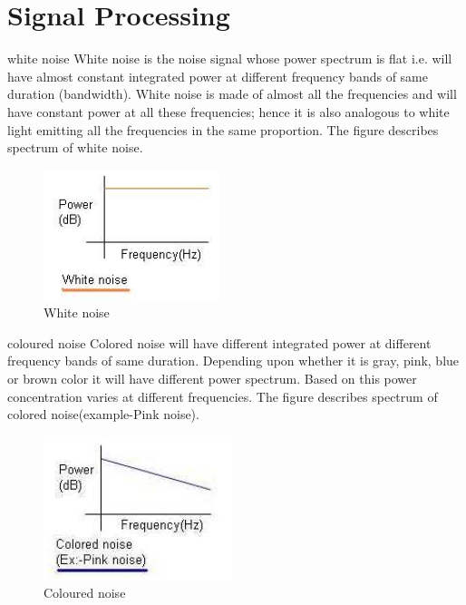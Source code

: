 \chapter{Signal Processing}
\begin{item}
\item[white noise]White noise is the noise signal whose power spectrum is flat i.e. will have almost constant integrated power at different frequency bands of same duration (bandwidth). White noise is made of almost all the frequencies and will have constant power at all these frequencies; hence it is also analogous to white light emitting all the frequencies in the same proportion. The figure describes spectrum of white noise.
\begin{figure}
  \centering
  \includegraphics[scale=0.45]{images/I/wn.png}
  \caption{White noise}\label{fig:wn}
\end{figure}

\item[coloured noise]Colored noise will have different integrated power at different frequency bands of same duration. Depending upon whether it is gray, pink, blue or brown color it will have different power spectrum. Based on this power concentration varies at different frequencies. The figure describes spectrum of colored noise(example-Pink noise).
\begin{figure}
  \centering
  \includegraphics[scale=0.45]{images/I/cn.png}
  \caption{Coloured noise}\label{fig:cn}
\end{figure}

\end{item}


